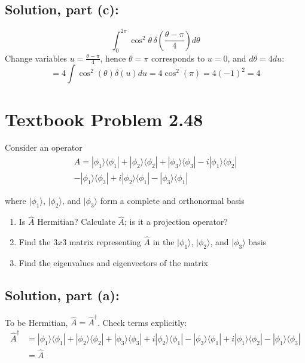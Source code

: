 \documentclass[12pt]{article}
\begin{document}
    \subsection*{Solution, part (c):}
        \[
        \int_0^{2\pi}\cos^2\theta\,\delta\left(\frac{\theta-\pi}{4}\right)d\theta
        \]
        Change variables \(u=\frac{\theta-\pi}{4}\), hence \(\theta=\pi\) corresponds to \(u=0\), and \(d\theta=4du\):
        \[
        =4\int \cos^2(\theta)\delta(u) du = 4\cos^2(\pi)=4(-1)^2=4
        \]

\section*{Textbook Problem 2.48}
    Consider an operator
    \begin{equation}
        \begin{split}
            \hat{A} = |\phi_1\rangle \langle\phi_1| + |\phi_2\rangle \langle\phi_2| + |\phi_3\rangle \langle\phi_3| - i|\phi_1\rangle \langle\phi_2|\\       -|\phi_1\rangle \langle\phi_3| + i |\phi_2\rangle \langle\phi_1| - |\phi_3\rangle \langle\phi_1|
        \end{split}
    \end{equation}

    where $|\phi_1\rangle$, $|\phi_2\rangle$, and $|\phi_3\rangle$ form a complete and orthonormal basis
    \begin{enumerate}
        \item [(a)] Is $\hat{A}$ Hermitian? Calculate $\hat{A}$; is it a projection operator?
        \item [(b)] Find the $3x3$ matrix representing $\hat{A}$ in the $|\phi_1\rangle$, $|\phi_2\rangle$, and $|\phi_3\rangle$ basis
        \item [(c)] Find the eigenvalues and eigenvectors of the matrix
    \end{enumerate}

    \subsection*{Solution, part (a):}
        To be Hermitian, \(\hat{A}=\hat{A}^\dagger\). Check terms explicitly:
        \begin{align*}
        \hat{A}^\dagger &=|\phi_1\rangle\langle\phi_1|+|\phi_2\rangle\langle\phi_2|+|\phi_3\rangle\langle\phi_3|
        +i|\phi_2\rangle\langle\phi_1|-|\phi_3\rangle\langle\phi_1|+i|\phi_1\rangle\langle\phi_2|-|\phi_1\rangle\langle\phi_3|\\
        &=\hat{A}
        \end{align*}
        
\end{document}
